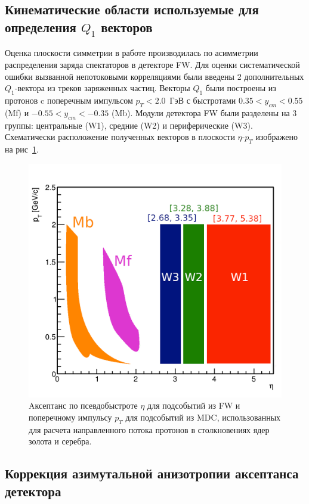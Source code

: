 \subsection{Кинематические области используемые для определения $Q_1$ векторов}

Оценка плоскости симметрии в работе производилась по асимметрии распределения заряда спектаторов в детекторе FW. 
Для оценки систематической ошибки вызванной непотоковыми корреляциями были введены 2 дополнительных $Q_1$-вектора из треков заряженных частиц.
Векторы $Q_1$ были построены из протонов c поперечным импульсом $p_T < 2.0$~ГэВ с быстротами $0.35 < y_{cm} < 0.55$ (Mf) и $-0.55 < y_{cm} < -0.35$ (Mb).
Модули детектора FW были разделены на 3 группы: центральные (W1), средние (W2) и периферические (W3).
Схематически расположение полученных векторов в плоскости $\eta$-$p_T$ изображено на рис~\ref{fig:hades_qvectors}.
%
\begin{figure}[ht]
\begin{center}
\includegraphics[width=0.75\linewidth]{images/eta_pt_qvectors.png}
\caption{Aксептанс по псевдобыстроте $\eta$ для подсобытий из FW и поперечному импульсу $p_T$ для подсобытий из MDC, использованных для расчета направленного потока протонов в столкновениях ядер золота и серебра.}
\label{fig:hades_qvectors}
\end{center}
\end{figure}
%

\subsection{Коррекция азимутальной анизотропии аксептанса детектора}

